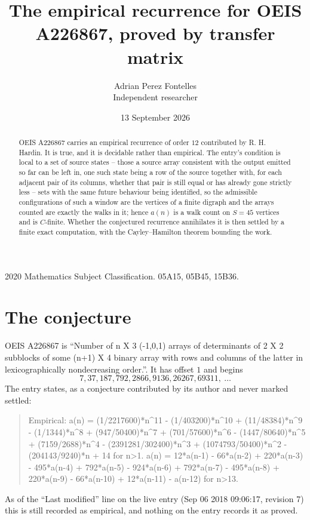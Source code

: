 \documentclass[11pt,a4paper]{article}
\title{The empirical recurrence for OEIS A226867, proved by transfer matrix}
\author{Adrian Perez Fontelles\\ \small Independent researcher}
\date{13 September 2026}
\theoremstyle{plain}
\theoremstyle{definition}
\begin{document}
\maketitle

\begin{abstract}
OEIS A226867 carries an empirical recurrence of order $12$ contributed by R. H. Hardin. It is
true, and it is decidable rather than empirical. The entry's condition is local to a set of source states -- those a source array consistent with the output emitted so far can be left in, one such state being a row of the source together with, for each adjacent pair of its columns, whether that pair is still equal or has already gone strictly less -- sets with the same future behaviour being identified, so
the admissible configurations of such a window are the vertices of a finite digraph and the
arrays counted are exactly the walks in it; hence $a(n)$ is a walk count on $S=45$ vertices
and is $C$-finite. Whether the conjectured recurrence annihilates it is then settled by a
finite exact computation, with the Cayley--Hamilton theorem bounding the work.
\end{abstract}

\noindent\small 2020 Mathematics Subject Classification. 05A15, 05B45, 15B36.\normalsize

\section{The conjecture}

OEIS A226867 is ``Number of n X 3 (-1,0,1) arrays of determinants of 2 X 2 subblocks of some (n+1) X 4 binary array with rows and columns of the latter in lexicographically nondecreasing order.''. It has offset $1$ and begins
\[
7, 37, 187, 792, 2866, 9136, 26267, 69311,\ \dots
\]
The entry states, as a conjecture contributed by its author and never marked settled:
\begin{quote}
Empirical: a(n) = (1/2217600)*n\^{}11 - (1/403200)*n\^{}10 + (11/48384)*n\^{}9 - (1/1344)*n\^{}8 + (947/50400)*n\^{}7 + (701/57600)*n\^{}6 - (1447/80640)*n\^{}5 + (7159/2688)*n\^{}4 - (2391281/302400)*n\^{}3 + (1074793/50400)*n\^{}2 - (204143/9240)*n + 14 for n>1. a(n) = 12*a(n-1) - 66*a(n-2) + 220*a(n-3) - 495*a(n-4) + 792*a(n-5) - 924*a(n-6) + 792*a(n-7) - 495*a(n-8) + 220*a(n-9) - 66*a(n-10) + 12*a(n-11) - a(n-12) for n>13.
\end{quote}
As of the ``Last modified'' line on the live entry (Sep 06 2018 09:06:17, revision 7) this is still
recorded as empirical, and nothing on the entry records it as proved.
\end{document}

